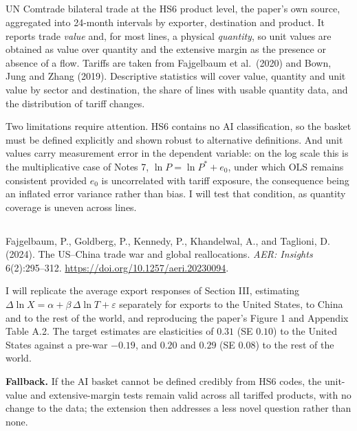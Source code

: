 \documentclass[11pt]{article}
\begin{document}
\subsection{}
UN Comtrade bilateral trade at the HS6 product level, the paper's own source,
aggregated into 24-month intervals by exporter, destination and product. It
reports trade \emph{value} and, for most lines, a physical \emph{quantity}, so
unit values are obtained as value over quantity and the extensive margin as the
presence or absence of a flow. Tariffs are taken from Fajgelbaum et al.\ (2020)
and Bown, Jung and Zhang (2019). Descriptive statistics will cover value,
quantity and unit value by sector and destination, the share of lines with
usable quantity data, and the distribution of tariff changes.

Two limitations require attention. HS6 contains no AI classification, so the
basket must be defined explicitly and shown robust to alternative definitions.
And unit values carry measurement error in the dependent variable: on the log
scale this is the multiplicative case of Notes 7, $\ln P = \ln P^{*} + e_0$,
under which OLS remains consistent provided $e_0$ is uncorrelated with tariff
exposure, the consequence being an inflated error variance rather than bias.
I will test that condition, as quantity coverage is uneven across lines.

\subsection{}
Fajgelbaum, P., Goldberg, P., Kennedy, P., Khandelwal, A., and Taglioni, D.
(2024). The US--China trade war and global reallocations. \emph{AER: Insights}
6(2):295--312. \url{https://doi.org/10.1257/aeri.20230094}.

I will replicate the average export responses of Section III, estimating
$\Delta \ln X = \alpha + \beta\,\Delta \ln T + \varepsilon$ separately for
exports to the United States, to China and to the rest of the world, and
reproducing the paper's Figure 1 and Appendix Table A.2. The target estimates
are
elasticities of $0.31$ (SE $0.10$) to the United States against a pre-war
$-0.19$, and $0.20$ and $0.29$ (SE $0.08$) to the rest of the world.

\textbf{Fallback.} If the AI basket cannot be defined credibly from HS6 codes,
the unit-value and extensive-margin tests remain valid across all tariffed
products, with no change to the data; the extension then addresses a less novel
question rather than none.
\end{document}
